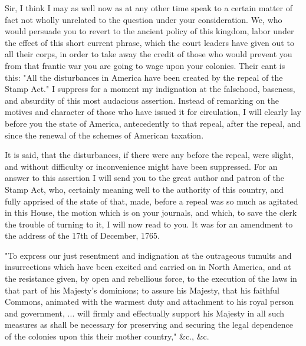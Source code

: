 Sir, I think I may as well now as at any other time speak to a certain matter of fact not wholly unrelated to the question under your consideration. We, who would persuade you to revert to the ancient policy of this kingdom, labor under the effect of this short current phrase, which the court leaders have given out to all their corps, in order to take away the credit of those who would prevent you from that frantic war you are going to wage upon your colonies. Their cant is this: "All the disturbances in America have been created by the repeal of the Stamp Act." I suppress for a moment my indignation at the falsehood, baseness, and absurdity of this most audacious assertion. Instead of remarking on the motives and character of those who have issued it for circulation, I will clearly lay before you the state of America, antecedently to that repeal, after the repeal, and since the renewal of the schemes of American taxation.

It is said, that the disturbances, if there were any before the repeal, were slight, and without difficulty or inconvenience might have been suppressed. For an answer to this assertion I will send you to the great author and patron of the Stamp Act, who, certainly meaning well to the authority of this country, and fully apprised of the state of that, made, before a repeal was so much as agitated in this House, the motion which is on your journals, and which, to save the clerk the trouble of turning to it, I will now read to you. It was for an amendment to the address of the 17th of December, 1765.

"To express our just resentment and indignation at the outrageous tumults and insurrections which have been excited and carried on in North America, and at the resistance given, by open and rebellious force, to the execution of the laws in that part of his Majesty's dominions; to assure his Majesty, that his faithful Commons, animated with the warmest duty and attachment to his royal person and government, ... will firmly and effectually support his Majesty in all such measures as shall be necessary for preserving and securing the legal dependence of the colonies upon this their mother country," \&c., \&c.

